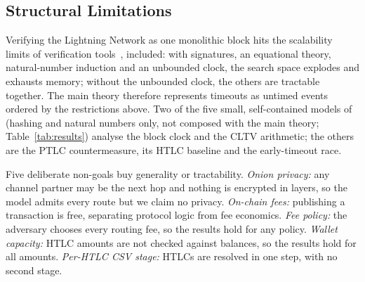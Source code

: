 \subsection{Structural Limitations}\label{sec:structure}

Verifying the Lightning Network as one monolithic block hits the scalability limits of
verification tools~\cite{grundmann2026}, \tamarin{} included: with signatures, an equational
theory, natural-number induction and an unbounded clock, the search space explodes and
\tamarin{} exhausts memory; without the unbounded clock, the others are tractable together. The
main theory therefore represents timeouts as untimed events ordered by the restrictions above.
Two of the five small, self-contained models of  (hashing and natural
numbers only, not composed with the main theory; Table~\ref{tab:results}) analyse the block
clock and the CLTV arithmetic; the others are the PTLC countermeasure, its HTLC baseline and the
early-timeout race.

Five deliberate non-goals buy generality or tractability. \emph{Onion privacy:} any channel
partner may be the next hop and nothing is encrypted in layers, so the model admits every route but
we claim no privacy. \emph{On-chain fees:} publishing a transaction is free,
separating protocol logic from fee economics. \emph{Fee policy:} the adversary chooses
every routing fee, so the results hold for any policy. \emph{Wallet capacity:} HTLC amounts are
not checked against balances, so the results hold for all amounts. \emph{Per-HTLC CSV
stage:} HTLCs are resolved in one step, with no second stage.
